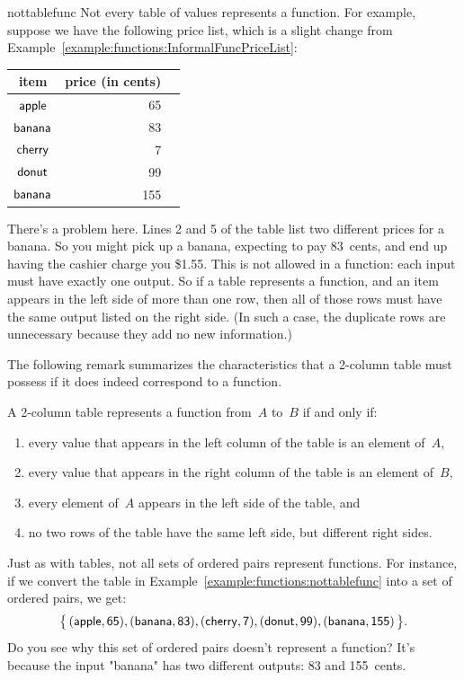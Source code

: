 \begin{example}{nottablefunc}
Not every table of values represents a function. For example, suppose we have the following price list, which is a slight change from Example~\ref{example:functions:InformalFuncPriceList}:

\begin{center}
\begin{tabular}{c|rr}
item &  price (in cents) \\ \hline

$\sf{apple}$ &  65 \\
$\sf{banana}$ & 83 \\
$\sf{cherry}$ & 7 \\
$\sf{donut}$ & 99 \\
$\sf{banana}$ & 155 \\
\end{tabular}
\end{center}
There's a problem here. Lines 2 and 5 of the table list two different prices for a banana. So you might pick up a banana, expecting to pay 83~cents, and end up having the cashier charge you \$1.55. This is not allowed in a function: each input must have exactly one output. So if a table represents a function, and an item appears in the left side of more than one row, then all of those rows must have the same output listed on the right side. (In such a case, the duplicate rows are unnecessary because they add no new information.)
\end{example}

The following remark summarizes the characteristics that a 2-column table must possess if it 
does indeed correspond to a function.

\begin{rem}
A 2-column table represents a function from~$A$ to~$B$ if and only if:
\begin{enumerate}
\item every value that appears in the left column of the table is an element of~$A$,
\item every value that appears in the right column of the table is an element of~$B$,
\item every element of~$A$ appears in the left side of the table,
and
\item no two rows of the table have the same left side, but different right sides.
\end{enumerate}
\end{rem}

\noindent
Just as with  tables, not all sets of ordered pairs represent functions.  For instance, if we convert the table in Example~\ref{example:functions:nottablefunc} into a set of ordered pairs, we get:
$$ \bigl\{\, (\sf{apple}, 65), 
 (\sf{banana}, 83), 
 (\sf{cherry}, 7),
  (\sf{donut}, 99), 
  (\sf{banana}, 155) \,\bigr\} .$$
Do you see why this set of ordered pairs doesn't represent a function?  It's because the input "banana" has two different outputs:  83 and 155~cents.  

